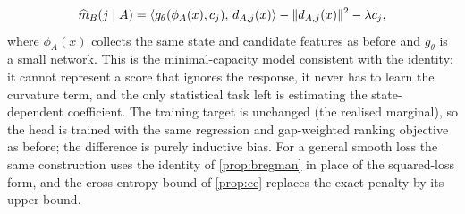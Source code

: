 \begin{equation}
 \widehat m_B(j\mid A)
 =
 \langle g_\theta(\phi_A(x), c_j),\, d_{A,j}(x)\rangle
 -\|d_{A,j}(x)\|^2 - \lambda c_j ,
 \label{eq:bilinear-head}
\end{equation}
where $\phi_A(x)$ collects the same state and candidate features as before and
$g_\theta$ is a small network. This is the minimal-capacity model consistent
with the identity: it cannot represent a score that ignores the response, it
never has to learn the curvature term, and the only statistical task left is
estimating the state-dependent coefficient. The training target is unchanged
(the realised marginal), so the head is trained with the same regression and
gap-weighted ranking objective as before; the difference is purely inductive
bias. For a general smooth loss the same construction uses the identity of
\cref{prop:bregman} in place of the squared-loss form, and the cross-entropy
bound of \cref{prop:ce} replaces the exact penalty by its upper bound.

